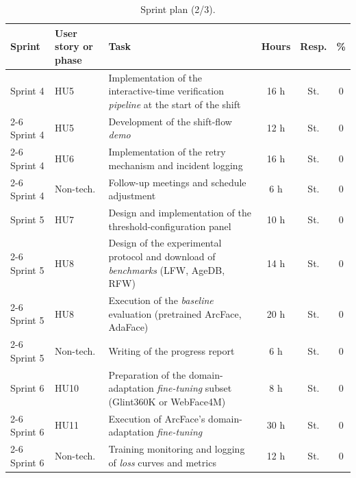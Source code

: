 \documentclass[
  11pt, %
]{charter}
\begin{document}
\begin{table}[htpb]
  \centering
  \caption{Sprint plan (2/3).}
  \begin{tabularx}{\linewidth}{@{}|l|X|X|c|c|c|@{}}
    \hline
    \rowcolor[HTML]{C0C0C0}
    Sprint & User story or phase & Task & Hours & Resp. & \% \\ \hline

    Sprint 4 & HU5 & Implementation of the interactive-time verification \textit{pipeline} at the start of the shift & 16 h & St. & 0 \\ \cline{2-6}
    Sprint 4 & HU5 & Development of the shift-flow \textit{demo} & 12 h & St. & 0 \\ \cline{2-6}
    Sprint 4 & HU6 & Implementation of the retry mechanism and incident logging & 16 h & St. & 0 \\ \cline{2-6}
    Sprint 4 & Non-tech. & Follow-up meetings and schedule adjustment & 6 h & St. & 0 \\ \hline

    Sprint 5 & HU7 & Design and implementation of the threshold-configuration panel & 10 h & St. & 0 \\ \cline{2-6}
    Sprint 5 & HU8 & Design of the experimental protocol and download of \textit{benchmarks} (LFW, AgeDB, RFW) & 14 h & St. & 0 \\ \cline{2-6}
    Sprint 5 & HU8 & Execution of the \textit{baseline} evaluation (pretrained ArcFace, AdaFace) & 20 h & St. & 0 \\ \cline{2-6}
    Sprint 5 & Non-tech. & Writing of the progress report & 6 h & St. & 0 \\ \hline

    Sprint 6 & HU10 & Preparation of the domain-adaptation \textit{fine-tuning} subset (Glint360K or WebFace4M) & 8 h & St. & 0 \\ \cline{2-6}
    Sprint 6 & HU11 & Execution of ArcFace's domain-adaptation \textit{fine-tuning} & 30 h & St. & 0 \\ \cline{2-6}
    Sprint 6 & Non-tech. & Training monitoring and logging of \textit{loss} curves and metrics & 12 h & St. & 0 \\ \hline

  \end{tabularx}
\end{table}
\end{document}
